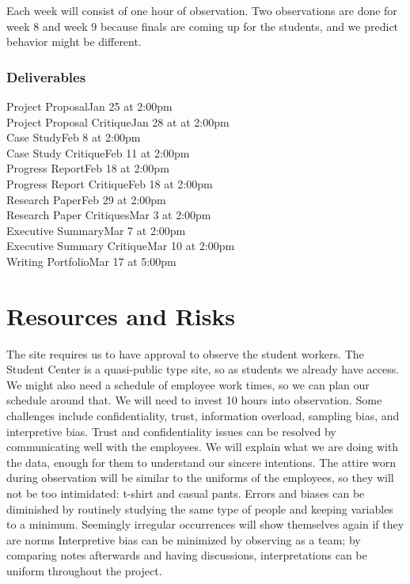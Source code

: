 \documentclass[letterpaper, 12pt]{report}
\begin{document}
Each week will consist of one hour of observation. Two observations are done for week 8 and week 9 because finals are coming up for the students, and we predict behavior might be different.

\subsubsection{Deliverables}

\noindent Project Proposal\hfill Jan 25 at 2:00pm\\
Project Proposal Critique\hfill Jan 28 at  at 2:00pm\\
Case Study\hfill Feb 8  at 2:00pm\\
Case Study Critique\hfill Feb 11 at 2:00pm\\
Progress Report\hfill Feb 18 at 2:00pm\\
Progress Report Critique\hfill Feb 18 at 2:00pm\\
Research Paper\hfill Feb 29 at 2:00pm\\
Research Paper Critiques\hfill Mar 3 at 2:00pm\\
Executive Summary\hfill Mar 7 at 2:00pm\\
Executive Summary Critique\hfill Mar 10 at 2:00pm\\
Writing Portfolio\hfill Mar 17 at 5:00pm


\section{Resources and Risks}

The site requires us to have approval to observe the student workers. The Student Center is a quasi-public type site, so as students we already have access. We might also need a schedule of employee work times, so we can plan our schedule around that. We will need to invest 10 hours into observation. Some challenges include confidentiality, trust, information overload, sampling bias, and interpretive bias. Trust and confidentiality issues can be resolved by communicating well with the employees. We will explain what we are doing with the data, enough for them to understand our sincere intentions. The attire worn during observation will be similar to the uniforms of the employees, so they will not be too intimidated: t-shirt and casual pants. Errors and biases can be diminished by routinely studying the same type of people and keeping variables to a minimum. Seemingly irregular occurrences will show themselves again if they are norms Interpretive bias can be minimized by observing as a team; by comparing notes afterwards and having discussions, interpretations can be uniform throughout the project.
\end{document}

